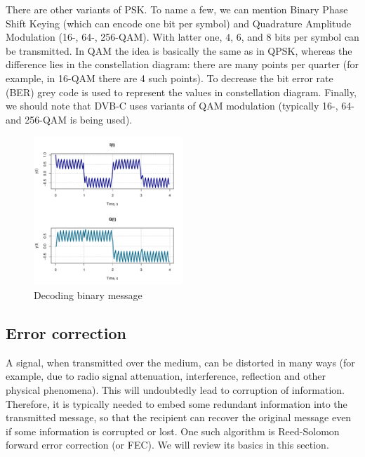 There are other variants of PSK. To name a few, we can mention Binary Phase Shift 
Keying (which can encode one bit per symbol) and 
Quadrature Amplitude Modulation (16-, 64-, 256-QAM). With latter one, 
$4$, $6$, and $8$ bits per symbol can be transmitted. In QAM the idea is basically
the same as in QPSK, whereas the difference lies in the constellation diagram: there are
many points per quarter (for example, in 16-QAM there are 4 such points). To decrease
the bit error rate (BER) grey code is used to represent the values in 
constellation diagram. Finally, we should note that DVB-C uses variants of 
QAM modulation (typically 16-, 64- and 256-QAM is being used).

\begin{figure}[ht]
\centering
\includegraphics[width=0.5\textwidth]{graphics/qpsk_demod_lowpass.pdf}
\caption{Decoding binary message}
\label{fig:qpsk_demodulated}
\end{figure}





\subsection{Error correction}

A signal, when transmitted over the medium, can be distorted 
in many ways (for example, due to radio signal attenuation, interference, 
reflection and other physical phenomena). This will undoubtedly lead 
to corruption of information. Therefore, it is typically 
needed to embed some redundant information into the transmitted message, 
so that the recipient can recover the original message even if some 
information is corrupted or lost. One such algorithm is Reed-Solomon 
forward error correction (or FEC). We will review its basics in this 
section.

